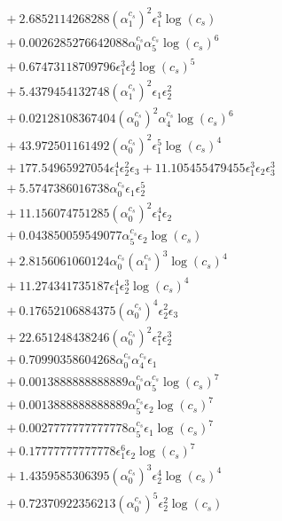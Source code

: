 \documentclass[10pt]{article}
\begin{document}
\begin{align*}
&{}  + 2.6852114268288 \left(\alpha_{1}^{c_s}\right)^{2} \epsilon_{1}^{3} \log{\left(c_{s} \right)} \\
&{}  + 0.0026285276642088 \alpha_{0}^{c_s} \alpha_{5}^{c_s} \log{\left(c_{s} \right)}^{6} \\
&{}  + 0.67473118709796 \epsilon_{1}^{3} \epsilon_{2}^{4} \log{\left(c_{s} \right)}^{5} \\
&{}  + 5.4379454132748 \left(\alpha_{1}^{c_s}\right)^{2} \epsilon_{1} \epsilon_{2}^{2} \\
&{}  + 0.02128108367404 \left(\alpha_{0}^{c_s}\right)^{2} \alpha_{4}^{c_s} \log{\left(c_{s} \right)}^{6} \\
&{}  + 43.972501161492 \left(\alpha_{0}^{c_s}\right)^{2} \epsilon_{1}^{5} \log{\left(c_{s} \right)}^{4} \\
&{}  + 177.54965927054 \epsilon_{1}^{4} \epsilon_{2}^{2} \epsilon_{3} + 11.105455479455 \epsilon_{1}^{3} \epsilon_{2} \epsilon_{3}^{3} \\
&{}  + 5.5747386016738 \alpha_{0}^{c_s} \epsilon_{1} \epsilon_{2}^{5} \\
&{}  + 11.156074751285 \left(\alpha_{0}^{c_s}\right)^{2} \epsilon_{1}^{4} \epsilon_{2} \\
&{}  + 0.043850059549077 \alpha_{5}^{c_s} \epsilon_{2} \log{\left(c_{s} \right)} \\
&{}  + 2.8156061060124 \alpha_{0}^{c_s} \left(\alpha_{1}^{c_s}\right)^{3} \log{\left(c_{s} \right)}^{4} \\
&{}  + 11.274341735187 \epsilon_{1}^{4} \epsilon_{2}^{3} \log{\left(c_{s} \right)}^{4} \\
&{}  + 0.17652106884375 \left(\alpha_{0}^{c_s}\right)^{4} \epsilon_{2}^{2} \epsilon_{3} \\
&{}  + 22.651248438246 \left(\alpha_{0}^{c_s}\right)^{2} \epsilon_{1}^{2} \epsilon_{2}^{3} \\
&{}  + 0.70990358604268 \alpha_{0}^{c_s} \alpha_{4}^{c_s} \epsilon_{1} \\
&{}  + 0.0013888888888889 \alpha_{0}^{c_s} \alpha_{5}^{c_s} \log{\left(c_{s} \right)}^{7} \\
&{}  + 0.0013888888888889 \alpha_{5}^{c_s} \epsilon_{2} \log{\left(c_{s} \right)}^{7} \\
&{}  + 0.0027777777777778 \alpha_{5}^{c_s} \epsilon_{1} \log{\left(c_{s} \right)}^{7} \\
&{}  + 0.17777777777778 \epsilon_{1}^{6} \epsilon_{2} \log{\left(c_{s} \right)}^{7} \\
&{}  + 1.4359585306395 \left(\alpha_{0}^{c_s}\right)^{3} \epsilon_{2}^{4} \log{\left(c_{s} \right)}^{4} \\
&{}  + 0.72370922356213 \left(\alpha_{0}^{c_s}\right)^{5} \epsilon_{2}^{2} \log{\left(c_{s} \right)}
\end{align*}
\end{document}
